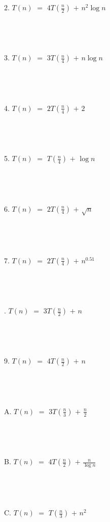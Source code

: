 \documentclass[12pt]{article}
\begin{document}
2. $T(n)$ $=$ $4T(\frac{n}{2})$ $+$ $n^2\log{n}$\\\\\\\\\\
3. $T(n)$ $=$ $3T(\frac{n}{4})$ $+$ $n\log{n}$\\\\\\\\\\
4. $T(n)$ $=$ $2T(\frac{n}{4})$ $+$ $2$\\\\\\\\\\
5. $T(n)$ $=$ $T(\frac{n}{4})$ $+$ $\log{n}$\\\\\\\\\\
6. $T(n)$ $=$ $2T(\frac{n}{4})$ $+$ $\sqrt{n}$\\\\\\\\\\
7. $T(n)$ $=$ $2T(\frac{n}{4})$ $+$ $n^{0.51}$\\\\\\\\\\
\newpage
{}. $T(n)$ $=$ $3T(\frac{n}{2})$ $+$ $n$\\\\\\\\\\
9. $T(n)$ $=$ $4T(\frac{n}{2})$ $+$ $n$\\\\\\\\\\
A. $T(n)$ $=$ $3T(\frac{n}{3})$ $+$ $\frac{n}{2}$\\\\\\\\\\
B. $T(n)$ $=$ $4T(\frac{n}{2})$ $+$ $\frac{n}{\log{n}}$\\\\\\\\\\
C. $T(n)$ $=$ $T(\frac{n}{3})$ $+$ $n^2$\\\\\\\\\\
\end{document}

